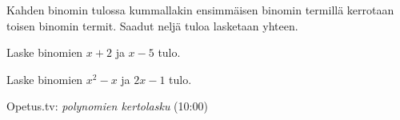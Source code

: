 Kahden binomin tulossa kummallakin ensimmäisen binomin termillä kerrotaan toisen binomin termit. Saadut neljä tuloa lasketaan yhteen. 

\newcommand{\pbezier}[4]{
	\pgfmathsetmacro{\PBxa}{#1}
	\pgfmathsetmacro{\PBxb}{#2}
	\pgfmathsetmacro{\PBya}{#3}
	\pgfmathsetmacro{\PByb}{#3+#4}
	\pgfmathsetmacro{\PBca}{0.8 * \PBxa + 0.2 * \PBxb}
	\pgfmathsetmacro{\PBcb}{0.2 * \PBxa + 0.8 * \PBxb}
	\draw[color=red] (\PBxa, \PBya) .. controls (\PBca, \PByb) and (\PBcb, \PByb) .. (\PBxb, \PBya);
}

\begin{esimerkki}
Laske binomien $x+2$ ja $x-5$ tulo. \\
\newline
\end{esimerkki}

\begin{esimerkki}
Laske binomien $x^2-x$ ja $2x-1$ tulo. \\
\newline
\end{esimerkki}

{Opetus.tv: \emph{polynomien kertolasku} (10:00)}

